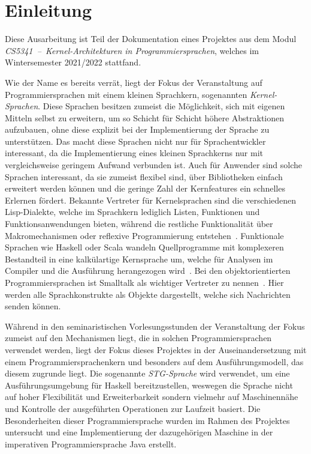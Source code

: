 
\chapter{Einleitung}

Diese Ausarbeitung ist Teil der Dokumentation eines Projektes aus dem Modul \textit{CS5341~--~Kernel-Architekturen in Programmiersprachen}, welches im Wintersemester 2021/2022 stattfand.

Wie der Name es bereits verrät, liegt der Fokus der Veranstaltung auf Programmiersprachen mit einem kleinen Sprachkern, sogenannten \textit{Kernel-Sprachen}.
Diese Sprachen besitzen zumeist die Möglichkeit, sich mit eigenen Mitteln selbst zu erweitern, um so Schicht für Schicht höhere Abstraktionen aufzubauen, ohne diese explizit bei der Implementierung der Sprache zu unterstützen.
Das macht diese Sprachen nicht nur für Sprachentwickler interessant, da die Implementierung eines kleinen Sprachkerns nur mit vergleichsweise geringem Aufwand verbunden ist.
Auch für Anwender sind solche Sprachen interessant, da sie zumeist flexibel sind, über Bibliotheken einfach erweitert werden können und die geringe Zahl der Kernfeatures ein schnelles Erlernen fördert.
Bekannte Vertreter für Kernelsprachen sind die verschiedenen Lisp-Dialekte, welche im Sprachkern lediglich Listen, Funktionen und Funktionsanwendungen bieten, während die restliche Funktionalität über Makromechanismen oder reflexive Programmierung entstehen~\cite{Graham_LispAdvanced,Steele_CommonLisp}.
Funktionale Sprachen wie Haskell oder Scala wandeln Quellprogramme mit komplexeren Bestandteil in eine kalkülartige Kernsprache um, welche für Analysen im Compiler und die Ausführung herangezogen wird~\cite{Wadler_HaskellLazyClass, Odersky_Scala}.
Bei den objektorientierten Programmiersprachen ist Smalltalk als wichtiger Vertreter zu nennen~\cite{Goldberg_Smalltalk80}.
Hier werden alle Sprachkonstrukte als Objekte dargestellt, welche sich Nachrichten senden können.

Während in den seminaristischen Vorlesungsstunden der Veranstaltung der Fokus zumeist auf den Mechanismen liegt, die in solchen Programmiersprachen verwendet werden, liegt der Fokus dieses Projektes in der Auseinandersetzung mit einem Programmiersprachenkern und besonders auf dem Ausführungsmodell, das diesem zugrunde liegt.
Die sogenannte \textit{STG-Sprache} wird verwendet, um eine Ausführungsumgebung für Haskell bereitzustellen, weswegen die Sprache nicht auf hoher Flexibilität und Erweiterbarkeit sondern vielmehr auf Maschinennähe und Kontrolle der ausgeführten Operationen zur Laufzeit basiert.
Die Besonderheiten dieser Programmiersprache wurden im Rahmen des Projektes untersucht und eine Implementierung der dazugehörigen Maschine in der imperativen Programmiersprache Java erstellt.

